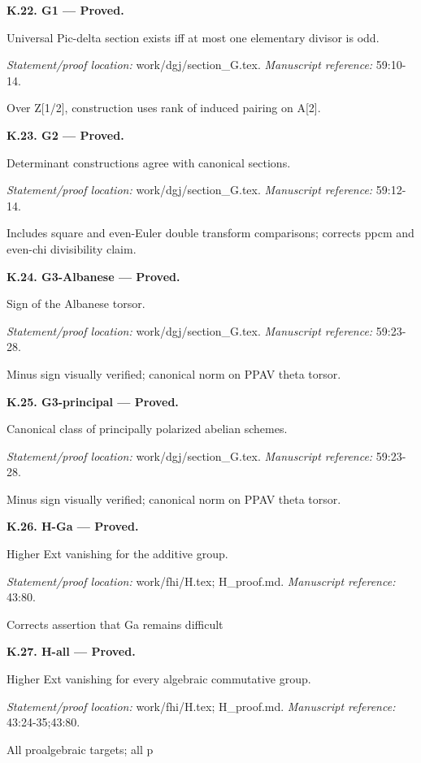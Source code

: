 \par\medskip\noindent\textbf{K.22. G1 --- Proved.}\par
Universal Pic-delta section exists iff at most one elementary divisor is odd.
\par\emph{Statement/proof location:} work/dgj/section\_G.tex.
\emph{Manuscript reference:} 59:10-14.
\par Over Z[1/2], construction uses rank of induced pairing on A[2].
\par\medskip\noindent\textbf{K.23. G2 --- Proved.}\par
Determinant constructions agree with canonical sections.
\par\emph{Statement/proof location:} work/dgj/section\_G.tex.
\emph{Manuscript reference:} 59:12-14.
\par Includes square and even-Euler double transform comparisons; corrects ppcm and even-chi divisibility claim.
\par\medskip\noindent\textbf{K.24. G3-Albanese --- Proved.}\par
Sign of the Albanese torsor.
\par\emph{Statement/proof location:} work/dgj/section\_G.tex.
\emph{Manuscript reference:} 59:23-28.
\par Minus sign visually verified; canonical norm on PPAV theta torsor.
\par\medskip\noindent\textbf{K.25. G3-principal --- Proved.}\par
Canonical class of principally polarized abelian schemes.
\par\emph{Statement/proof location:} work/dgj/section\_G.tex.
\emph{Manuscript reference:} 59:23-28.
\par Minus sign visually verified; canonical norm on PPAV theta torsor.
\par\medskip\noindent\textbf{K.26. H-Ga --- Proved.}\par
Higher Ext vanishing for the additive group.
\par\emph{Statement/proof location:} work/fhi/H.tex; H\_proof.md.
\emph{Manuscript reference:} 43:80.
\par Corrects assertion that Ga remains difficult
\par\medskip\noindent\textbf{K.27. H-all --- Proved.}\par
Higher Ext vanishing for every algebraic commutative group.
\par\emph{Statement/proof location:} work/fhi/H.tex; H\_proof.md.
\emph{Manuscript reference:} 43:24-35;43:80.
\par All proalgebraic targets; all p
